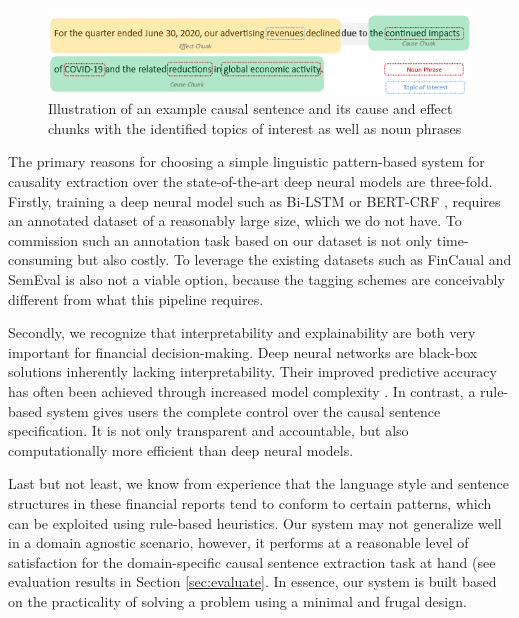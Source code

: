 \begin{figure}[h!]
\centering
  \includegraphics[width=\textwidth]{figures/CEchunks.png}
  \caption{Illustration of an example causal sentence and its cause and effect chunks with the identified topics of interest as well as noun phrases}
  \label{fig:chunks}
\end{figure}


The primary reasons for choosing a simple linguistic pattern-based system for causality extraction over the state-of-the-art deep neural models are three-fold. Firstly, training a deep neural model such as Bi-LSTM \cite{Li21BiLSTMCRF,Chen20} or BERT-CRF \cite {NTUNLPL20}, requires an annotated dataset of a reasonably large size, which we do not have. To commission such an annotation task based on our dataset is not only time-consuming but also costly. To leverage the existing datasets such as FinCaual \cite{FinCausal20} and SemEval \cite{SemEval07Task4, SemEval10Task8} is also not a viable option, because the tagging schemes are conceivably different from what this pipeline requires. 

Secondly, we recognize that interpretability and explainability are both very important for financial decision-making. Deep neural networks are black-box solutions inherently lacking interpretability. Their improved predictive accuracy has often been achieved through increased model complexity \cite{explainableAI2021}. In contrast, a rule-based system gives users the complete control over the causal sentence specification. It is not only transparent and accountable, but also computationally more efficient than deep neural models.  

Last but not least, we know from experience that the language style and sentence structures in these financial reports tend to conform to certain patterns, which can be exploited using rule-based heuristics. Our system may not generalize well in a domain agnostic scenario, however, it performs at a reasonable level of satisfaction for the domain-specific causal sentence extraction task at hand (see evaluation results in Section \ref{sec:evaluate}. In essence, our system is built based on the practicality of solving a problem using a minimal and frugal design.


